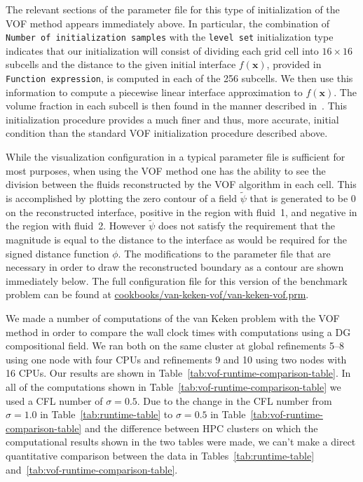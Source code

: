 

The relevant sections of the parameter file for this type of initialization of the VOF method 
appears immediately above.
In particular, the combination of \texttt{Number of initialization samples} with the 
\texttt{level set} initialization type indicates that our initialization will consist of 
dividing each grid cell into $16 \times 16$ subcells and the distance to the given initial 
interface $f(\mathbf x)$, provided in \texttt{Function expression}, is computed in each of the 256 
subcells.
We then use this information to compute a piecewise linear interface approximation to $f(\mathbf x)$.
The volume fraction in each subcell is then found in the manner described 
in~\cite{JMR:2019,JMR-EGP:2019}.
This initialization procedure provides a much finer and thus, more accurate, initial condition 
than the standard VOF initialization procedure described above.

While the visualization configuration in a typical parameter file is sufficient for most 
purposes, when using the VOF method one has the ability to see the division between the fluids 
reconstructed by the VOF algorithm in each cell.
This is accomplished by plotting the zero contour of a field $\tilde\psi$ that
is generated to be $0$ on the reconstructed interface, positive in the region
with fluid~1, and negative in the region with fluid~2.
However $\tilde{\psi}$ does not satisfy the requirement that the magnitude is
equal to the distance to the interface as would be required for the signed
distance function $\phi$.
The modifications to the parameter file that are necessary in order to draw the reconstructed 
boundary as a contour are shown immediately below.
The full configuration file for this version of the benchmark problem can be found at 
\url{cookbooks/van-keken-vof/van-keken-vof.prm}.


\noindent

We made a number of computations of the van Keken problem with the VOF method in order to 
compare the wall clock times with computations using a DG compositional field.
We ran both on the same cluster at global refinements 5--8 using one node with four CPUs and 
refinements 9 and 10 using two nodes with 16 CPUs.
Our results are shown in Table~\ref{tab:vof-runtime-comparison-table}.
In all of the computations shown in Table~\ref{tab:vof-runtime-comparison-table} we used a CFL 
number of $\sigma=0.5$.
Due to the change in the CFL number from $\sigma = 1.0$ in Table~\ref{tab:runtime-table} to 
$\sigma = 0.5$ in Table~\ref{tab:vof-runtime-comparison-table} and the difference between HPC 
clusters on which the computational results shown in the two tables were made, we can't make a
direct quantitative comparison between the data in Tables~\ref{tab:runtime-table} 
and~\ref{tab:vof-runtime-comparison-table}.

